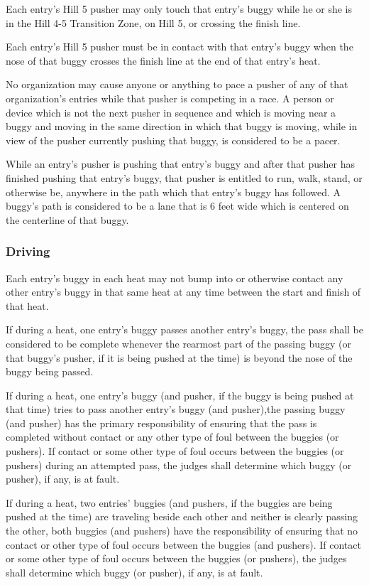 Each entry's Hill 5 pusher may only touch that entry's buggy while he or she is in the Hill 4-5 Transition Zone, on Hill 5, or crossing the finish line.

Each entry's Hill 5 pusher must be in contact with that entry's buggy when the nose of that buggy crosses the finish line at the end of that entry's heat.

No organization may cause anyone or anything to pace a pusher of any of that organization's entries while that pusher is competing in a race. A person or device which is not the next pusher in sequence and which is moving near a buggy and moving in the same direction in which that buggy is moving, while in view of the pusher currently pushing that buggy, is considered to be a pacer.

While an entry's pusher is pushing that entry's buggy and after that pusher has finished pushing that entry's buggy, that pusher is entitled to run, walk, stand, or otherwise be, anywhere in the path which that entry's buggy has followed. A buggy's path is considered to be a lane that is 6 feet wide which is centered on the centerline of that buggy.

\subsubsection{Driving}

Each entry's buggy in each heat may not bump into or otherwise contact any other entry's buggy in that same heat at any time between the start and finish of that heat.

If during a heat, one entry's buggy passes another entry's buggy, the pass shall be considered to be complete whenever the rearmost part of the passing buggy (or that buggy's pusher, if it is being pushed at the time) is beyond the nose of the buggy being passed.

If during a heat, one entry's buggy (and pusher, if the buggy is being pushed at that time) tries to pass another entry's buggy (and pusher),the passing buggy (and pusher) has the primary responsibility of ensuring that the pass is completed without contact or any other type of foul between the buggies (or pushers). If contact or some other type of foul occurs between the buggies (or pushers) during an attempted pass, the judges shall determine which buggy (or pusher), if any, is at fault.

If during a heat, two entries' buggies (and pushers, if the buggies are being pushed at the time) are traveling beside each other and neither is clearly passing the other, both buggies (and pushers) have the responsibility of ensuring that no contact or other type of foul occurs between the buggies (and pushers). If contact or some other type of foul occurs between the buggies (or pushers), the judges shall determine which buggy (or pusher), if any, is at fault.

